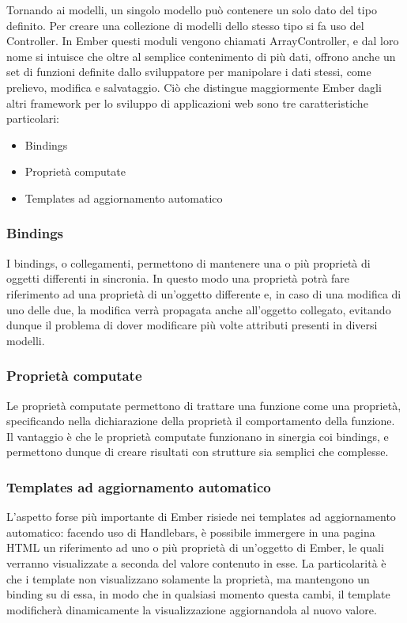 Tornando ai modelli, un singolo modello può contenere un solo dato del tipo definito. Per creare una collezione di modelli dello stesso tipo si fa uso del Controller. In Ember questi moduli vengono chiamati ArrayController, e dal loro nome si intuisce che oltre al semplice contenimento di più dati, offrono anche un set di funzioni definite dallo sviluppatore per manipolare i dati stessi, come prelievo, modifica e salvataggio.
\newpage
Ciò che distingue maggiormente Ember dagli altri framework per lo sviluppo di applicazioni web sono tre caratteristiche particolari:

\begin{itemize}
    \item Bindings
    \item Proprietà computate
    \item Templates ad aggiornamento automatico
\end{itemize}

\subsubsection{Bindings} %
\label{ssub:bindings}
I bindings, o collegamenti, permettono di mantenere una o più proprietà di oggetti differenti in sincronia. In questo modo una proprietà potrà fare riferimento ad una proprietà di un'oggetto differente e, in caso di una modifica di uno delle due, la modifica verrà propagata anche all'oggetto collegato, evitando dunque il problema di dover modificare più volte attributi presenti in diversi modelli.

\subsubsection{Proprietà computate} %
\label{ssub:propriet_computate}
Le proprietà computate permettono di trattare una funzione come una proprietà, specificando nella dichiarazione della proprietà il comportamento della funzione. Il vantaggio è che le proprietà computate funzionano in sinergia coi bindings, e permettono dunque di creare risultati con strutture sia semplici che complesse.

\subsubsection{Templates ad aggiornamento automatico} %
\label{ssub:templates_ad_aggiornamento_automatico}
L'aspetto forse più importante di Ember risiede nei templates ad aggiornamento automatico: facendo uso di Handlebars, è possibile immergere in una pagina HTML un riferimento ad uno o più proprietà di un'oggetto di Ember, le quali verranno visualizzate a seconda del valore contenuto in esse. La particolarità è che i template non visualizzano solamente la proprietà, ma mantengono un binding su di essa, in modo che in qualsiasi momento questa cambi, il template modificherà dinamicamente la visualizzazione aggiornandola al nuovo valore.

